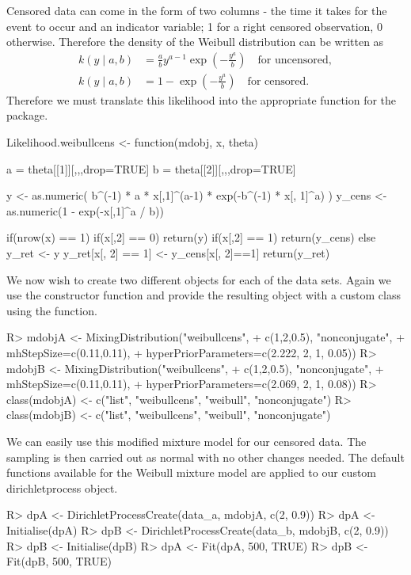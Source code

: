 \documentclass[nojss]{jss}
\begin{document}
Censored data can come in the form of two columns - the time it takes for the event to occur and an indicator variable; 1 for a right censored observation, 0 otherwise. Therefore the density of the Weibull distribution can be written as
\begin{align*}
k(y \mid a , b) & = \frac{a}{b} y ^{a-1}  \exp \left( -  \frac{y^a}{b}  \right) \quad \text{for uncensored}, \\
k(y \mid a , b) & = 1 - \exp \left( -\frac{y^a}{b} \right) \quad \text{for censored}.
\end{align*}
Therefore we must translate this likelihood into the appropriate function for the  package.

\begin{CodeInput}
Likelihood.weibullcens <- function(mdobj, x, theta){
  a = theta[[1]][,,,drop=TRUE]
  b = theta[[2]][,,,drop=TRUE]

  y <- as.numeric(
    b^(-1) * a * x[,1]^(a-1) * exp(-b^(-1) * x[, 1]^a)
  )
  y_cens <- as.numeric(1 - exp(-x[,1]^a / b))

  if(nrow(x) == 1){
    if(x[,2] == 0) return(y)
    if(x[,2] == 1) return(y_cens)
  }
  else{
    y_ret <- y
    y_ret[x[, 2] == 1] <- y_cens[x[, 2]==1]
    return(y_ret)
  }
}
\end{CodeInput}

We now wish to create two different  objects for each of the data sets. Again we use the  constructor function and provide the resulting object with a custom class using the  function.

\begin{Schunk}
\begin{Sinput}
R> mdobjA <- MixingDistribution("weibullcens",
+                               c(1,2,0.5), "nonconjugate",
+                               mhStepSize=c(0.11,0.11),
+                               hyperPriorParameters=c(2.222, 2, 1, 0.05))
R> mdobjB <- MixingDistribution("weibullcens",
+                               c(1,2,0.5), "nonconjugate",
+                               mhStepSize=c(0.11,0.11),
+                               hyperPriorParameters=c(2.069, 2, 1, 0.08))
R> class(mdobjA) <- c("list", "weibullcens", "weibull", "nonconjugate")
R> class(mdobjB) <- c("list", "weibullcens", "weibull", "nonconjugate")
\end{Sinput}
\end{Schunk}

We can easily use this modified mixture model for our censored data. The sampling is then carried out as normal with no other changes needed. The default functions available for the Weibull mixture model are applied to our custom dirichletprocess object.
\begin{Schunk}
\begin{Sinput}
R> dpA <- DirichletProcessCreate(data_a, mdobjA, c(2, 0.9))
R> dpA <- Initialise(dpA)
R> dpB <- DirichletProcessCreate(data_b, mdobjB, c(2, 0.9))
R> dpB <- Initialise(dpB)
R> dpA <- Fit(dpA, 500, TRUE)
R> dpB <- Fit(dpB, 500, TRUE)
\end{Sinput}
\end{Schunk}
\end{document}
